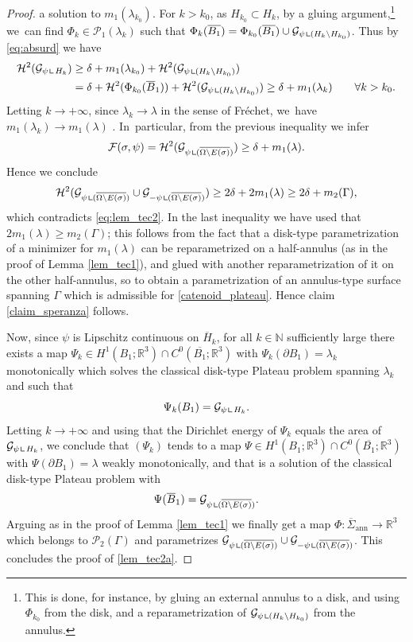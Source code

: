 \documentclass[JEP,XML,SOM,Unicode, NoFloatCountersInSection,published]{cedram}
\newcommand{\R}{\mathbb{R}}
\let\Om\Omega
\newcommand{\resa}{\mathop{\hbox{\vrule height 7pt width 0.5pt depth 0pt
\vrule height 0.5pt width 6pt depth 0pt}}\nolimits}
\newcommand{\resb}{\mathop{\hbox{\vrule height 4pt width 0.5pt depth 0pt
\vrule height 0.5pt width 3pt depth 0pt}}\nolimits}
\newcommand{\res}{\mathchoice{\resa}{\resa}{\resb}{\resb}}
\theoremstyle{definition}
\begin{document}
\begin{proof}
a solution to $m_1(\lambda_{k_0})$.
For $k> k_0$, as $H_{k_0}\subset H_k$, by a
gluing argument,\footnote{This is done, for instance, by gluing an external annulus to a disk, and using $\Phi_{k_0}$ from the disk, and a reparametrization of $\mathcal G_{\psi\res(H_k\setminus H_{k_0})}$ from the annulus.} we~can find $\Phi_k\in\mathcal{P}_1(\lambda_k)$ such that $\Phi_k(\overline{B_1})=\Phi_{k_0}(\overline{B_1})\cup \mathcal G_{\psi\res(H_k\setminus H_{k_0})}$. Thus by \eqref{eq:absurd} we have
\[
\begin{aligned}
\mathcal H^2( \mathcal G_{\psi\res H_{k}})
&\geq
\delta + m_1(\lambda_{k_0})
+
\mathcal H^2( \mathcal G_{\psi\res (H_k\setminus H_{k_0})})
\\
&=
\delta + \mathcal H^2(\Phi_{k_0}(\overline B_1))
+
\mathcal H^2( \mathcal G_{\psi\res (H_k\setminus H_{k_0})})
\geq
\delta+ m_1(\lambda_k)
\qquad \forall k> k_0.
\end{aligned}
\]
Letting $k\to +\infty$, since $\lambda_k\to\lambda$ in the sense of Fréchet, we~have $m_1(\lambda_k)\to m_1(\lambda)$ \cite[Th.\,4, \S 4.3]{DHS}.
In~particular, from the previous inequality we infer
\begin{equation*}
\mathcal{F}(\sigma,\psi)=\mathcal{H}^2(\mathcal G_{\psi\res(\overline{\Om\setminus E(\sigma)})})\ge\delta+m_1(\lambda).
\end{equation*}
Hence we conclude
\[
\mathcal{H}^2(\mathcal G_{\psi\res(\overline{\Om\setminus E(\sigma)})}\cup \mathcal G_{-\psi\res(\overline{\Om\setminus E(\sigma)})})\geq 2\delta+2m_1(\lambda)\geq 2\delta+m_2(\Gamma),
\]
which contradicts \eqref{eq:lem_tec2}.
In the last inequality we have used that $2m_1(\lambda)\geq m_2(\Gamma)$; this follows from the fact that a disk-type parametrization of a minimizer for $m_1(\lambda)$ can be reparametrized on a half-annulus (as in the proof of Lemma \ref{lem_tec1}), and glued with another reparametrization of it on the other half-annulus, so to obtain a parametrization of an annulus-type surface spanning $\Gamma$ which is admissible for \eqref{catenoid_plateau}.
Hence claim \eqref{claim_speranza} follows.

Now, since $\psi$ is Lipschitz continuous on $\overline H_k$, for
all $k\in \mathbb N$ sufficiently large there exists a
map $\Psi_k\in H^1(B_1;\R^3)\cap C^0(\overline {B_1};\R^3)$ with $\Psi_{k}(\partial B_1)=\lambda_{k}$ monotonically which solves the classical disk-type
Plateau problem {spanning} $\lambda_k$ and such that
\[
\Psi_k(B_1)=\mathcal G_{\psi\res H_k}.
\]
Letting $k\to +\infty$
and using that the Dirichlet energy of $\Psi_k$ equals the area of $\mathcal G_{\psi\res H_k}$, we
conclude that $(\Psi_k)$ tends to a map $\Psi\in H^1(B_1;\R^3)\cap C^0(\overline {B_1};\R^3)$
with $\Psi(\partial B_1)=\lambda$ {weakly} monotonically, and that is a solution of the classical disk-type Plateau problem with
\[
\Psi(\overline B_1)=\mathcal{G}_{\psi\res(\overline{\Om\setminus E(\sigma)})}.
\]
Arguing as in the proof of Lemma \ref{lem_tec1} we
finally get a map $\Phi:
\overline\Sigma_\mathrm{ann}\to \R^3$ which belongs to $\mathcal P_2(\Gamma)$ and parametrizes $\mathcal{G}_{\psi\res(\overline{\Om\setminus E(\sigma)})}\cup \mathcal{G}_{-\psi\res(\overline{\Om\setminus E(\sigma)})}$.
This concludes the proof of \ref{lem_tec2a}.


\end{proof}
\end{document}
